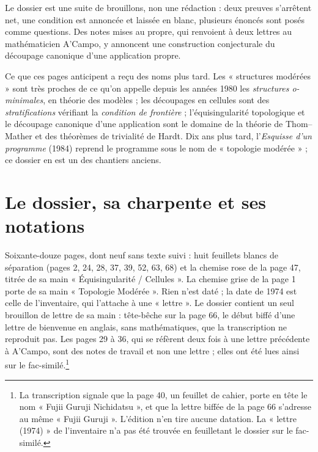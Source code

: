 \documentclass[11pt,a4paper]{article}
\begin{document}
\begin{resume}
Le dossier est une suite de brouillons, non une rédaction : deux preuves
s'arrêtent net, une condition est annoncée et laissée en blanc, plusieurs
énoncés sont posés comme questions. Des notes mises au propre, qui renvoient à
deux lettres au mathématicien A'Campo, y annoncent une construction conjecturale du
découpage canonique d'une application propre.

Ce que ces pages anticipent a reçu des noms plus tard. Les « structures
modérées » sont très proches de ce qu'on appelle depuis les années 1980 les
\emph{structures o-minimales}, en théorie des modèles ; les découpages en
cellules sont des \emph{stratifications} vérifiant la \emph{condition de
frontière} ; l'équisingularité topologique et le découpage canonique d'une
application sont le domaine de la théorie de Thom–Mather et des théorèmes de
trivialité de Hardt. Dix ans plus tard, l'\emph{Esquisse d'un programme}
(1984) reprend le programme sous le nom de « topologie modérée » ; ce dossier
en est un des chantiers anciens.

\end{resume}

\section*{Le dossier, sa charpente et ses notations}

Soixante-douze pages, dont neuf sans texte suivi : huit feuillets blancs de
séparation (pages 2, 24, 28, 37, 39, 52, 63, 68) et la chemise rose de la page
47, titrée de sa main « Équisingularité / Cellules ». La chemise
grise de la page 1 porte de sa main « Topologie Modérée ». Rien n'est daté ; la
date de 1974 est celle de l'inventaire, qui l'attache à une « lettre ». Le
dossier contient un seul brouillon de lettre de sa main : tête-bêche sur la
page 66, le début biffé d'une lettre de bienvenue en anglais, sans
mathématiques, que la transcription ne reproduit pas. Les pages 29 à 36, qui se
réfèrent deux fois à une lettre précédente à A'Campo, sont des notes de travail
et non une lettre ; elles ont été lues ainsi sur le fac-similé.\footnote{La transcription signale que la page
40, un feuillet de cahier, porte en tête le nom « Fujii Guruji Nichidatsu »,
et que la lettre biffée de la page 66 s'adresse au même « Fujii Guruji ».
L'édition n'en tire aucune datation. La « lettre (1974) » de l'inventaire n'a
pas été trouvée en feuilletant le dossier sur le fac-similé.}
\end{document}
